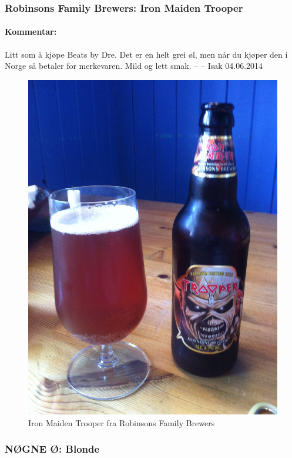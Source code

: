 \documentclass[12pt,a4paper,oneside,norsk]{article}
\begin{document}
\newpage
\subsubsection{Robinsons Family Brewers: Iron Maiden Trooper}
\paragraph{Kommentar:}Litt som å kjøpe Beats by Dre. Det er en helt grei øl, men når du kjøper den i Norge så betaler for merkevaren. Mild og lett smak. 
\newline
-- -- Isak 04.06.2014


\begin{figure} [H]
\centering
\includegraphics[scale=0.1, angle=270]{Bilder/Ol/thetrooper}
\caption{Iron Maiden Trooper fra Robinsons Family Brewers}
\end{figure}

\newpage
\subsubsection{NØGNE Ø: Blonde}
\end{document}
